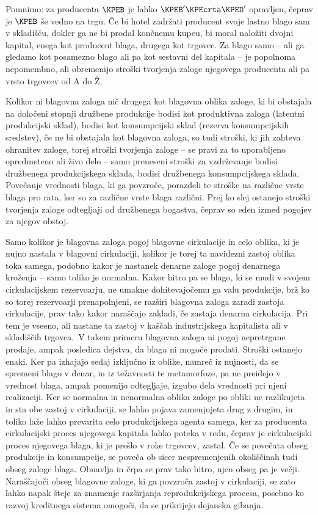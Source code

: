 \documentclass[kapital_02.tex]{subfiles}
\begin{document}
Pomnimo: za producenta \(\KPEB\) je lahko \(\KPEB'\KPEcrta\KPED'\) opravljen, čeprav je \(\KPEB\) še vedno na trgu.
Če bi hotel zadržati producent svoje lastno blago sam v skladišču, dokler ga ne bi prodal končnemu kupcu, bi moral naložiti dvojni kapital, enega kot producent blaga, drugega kot trgovec. 
Za blago samo -- ali ga gledamo kot posamezno blago ali pa kot sestavni del kapitala -- je popolnoma nepomembno, ali obremenijo stroški tvorjenja zaloge njegovega producenta ali pa vrsto trgovcev od A do Ž.

Kolikor ni blagovna zaloga nič drugega kot blagovna oblika zaloge, ki bi obstajala na določeni stopnji družbene produkcije bodisi kot produktivna zaloga (latentni produkcijski sklad), bodisi kot konsumpcijski sklad (rezerva konsumpcijskih sredstev), če ne bi obstajala kot blagovna zaloga, so tudi stroški, ki jih zahteva ohranitev zaloge, torej stroški tvorjenja zaloge -- se pravi za to uporabljeno opredmeteno ali živo delo -- samo preneseni stroški za vzdrževanje bodisi družbenega produkcijskega sklada, bodisi družbenega konsumpcijskega sklada.
Povečanje vrednosti blaga, ki ga povzroče, porazdeli te stroške na različne vrste blaga pro rata, ker so za različne vrste blaga različni.
Prej ko slej ostanejo stroški tvorjenja zaloge odtegljaji od družbenega bogastva, čeprav so eden izmed pogojev za njegov obstoj.

Samo kolikor je blagovna zaloga pogoj blagovne cirkulacije in celo oblika, ki je nujno nastala v blagovni cirkulaciji, kolikor je torej ta navidezni zastoj oblika toka samega, podobno kakor je nastanek denarne zaloge pogoj denarnega kroženja -- samo toliko je normalna.
Kakor hitro pa se blago, ki se mudi v svojem cirkulacijskem rezervoarju, ne umakne dohitevajočemu ga valu produkcije, brž ko so torej rezervoarji prenapolnjeni, se razširi blagovna zaloga zaradi zastoja cirkulacije, prav tako kakor naraščajo zakladi, če zastaja denarna cirkulacija.
Pri tem je vseeno, ali nastane ta zastoj v kaščah industrijskega kapitalista ali v skladiščih trgovca.\KPEstran\ 
V takem primeru blagovna zaloga ni pogoj nepretrgane prodaje, ampak posledica dejstva, da blaga ni mogoče prodati.
Stroški ostanejo enaki.
Ker pa izhajajo sedaj izključno iz oblike, namreč iz nujnosti, da se spremeni blago v denar, in iz težavnosti te metamorfoze, pa ne preidejo v vrednost blaga, ampak pomenijo odtegljaje, izgubo dela vrednosti pri njeni realizaciji.
Ker se normalna in nenormalna oblika zaloge po obliki ne razlikujeta in sta obe zastoj v cirkulaciji, se lahko pojava zamenjujeta drug z drugim, in toliko laže lahko prevarita celo produkcijskega agenta samega, ker za producenta cirkulacijski proces njegovega kapitala lahko poteka v redu, čeprav je cirkulacijski proces njegovega blaga, ki je prešlo v roke trgovcev, zastal.
Če se povečata obseg produkcije in konsumpcije, se poveča ob sicer nespremenjenih okoliščinah tudi obseg zaloge blaga.
Obnavlja in črpa se prav tako hitro, njen obseg pa je večji.
Naraščajoči obseg blagovne zaloge, ki ga povzroča zastoj v cirkulaciji, se zato lahko napak šteje za znamenje razširjanja reprodukcijskega procesa, posebno ko razvoj kreditnega sistema omogoči, da se prikrijejo dejanska gibanja.
\end{document}
